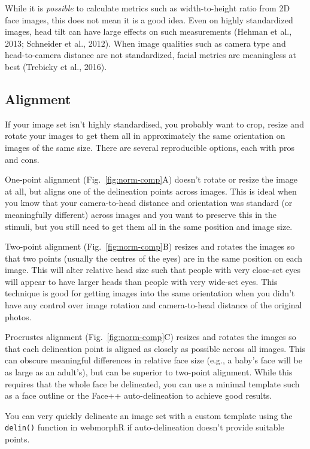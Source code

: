\documentclass[
  doc,floatsintext]{apa6}
\begin{document}
While it is \emph{possible} to calculate metrics such as width-to-height ratio from 2D face images, this does not mean it is a good idea. Even on highly standardized images, head tilt can have large effects on such measurements (Hehman et al., 2013; Schneider et al., 2012). When image qualities such as camera type and head-to-camera distance are not standardized, facial metrics are meaningless at best (Trebicky et al., 2016).

\hypertarget{alignment}{%
\subsection{Alignment}\label{alignment}}

If your image set isn't highly standardised, you probably want to crop, resize and rotate your images to get them all in approximately the same orientation on images of the same size. There are several reproducible options, each with pros and cons.

One-point alignment (Fig.~\ref{fig:norm-comp}A) doesn't rotate or resize the image at all, but aligns one of the delineation points across images. This is ideal when you know that your camera-to-head distance and orientation was standard (or meaningfully different) across images and you want to preserve this in the stimuli, but you still need to get them all in the same position and image size.

Two-point alignment (Fig.~\ref{fig:norm-comp}B) resizes and rotates the images so that two points (usually the centres of the eyes) are in the same position on each image. This will alter relative head size such that people with very close-set eyes will appear to have larger heads than people with very wide-set eyes. This technique is good for getting images into the same orientation when you didn't have any control over image rotation and camera-to-head distance of the original photos.

Procrustes alignment (Fig.~\ref{fig:norm-comp}C) resizes and rotates the images so that each delineation point is aligned as closely as possible across all images. This can obscure meaningful differences in relative face size (e.g., a baby's face will be as large as an adult's), but can be superior to two-point alignment. While this requires that the whole face be delineated, you can use a minimal template such as a face outline or the Face++ auto-delineation to achieve good results.

You can very quickly delineate an image set with a custom template using the \texttt{delin()} function in webmorphR if auto-delineation doesn't provide suitable points.
\end{document}
